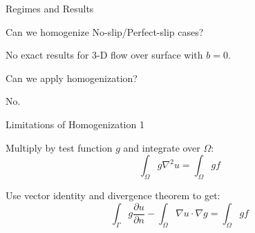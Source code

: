 \documentclass{beamer}
\begin{document}
\begin{frame}{Regimes and Results}
\begin{adjustbox}{scale=0.55, center}

\end{adjustbox}

\end{frame}


\begin{frame}{Can we homogenize No-slip/Perfect-slip cases?}

No exact results for 3-D flow over surface with $b=0$.

\vspace{1em}
Can we apply homogenization?

\vspace{1em}
No.

\end{frame}


\begin{frame}{Limitations of Homogenization 1}

\begin{center}
\end{center}

Multiply by test function $g$ and integrate over $\Omega$:
\begin{equation}
\int_{\Omega} g \nabla^2 u = \int_{\Omega} g f
\end{equation}

Use vector identity and divergence theorem to get:
\begin{equation}
\int_{\Gamma} g \frac{\partial u}{\partial n}
 - \int_{\Omega} \nabla u \cdot \nabla g  
= \int_{\Omega} g f
\end{equation}

\end{frame}
\end{document}
